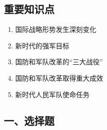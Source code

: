 \documentclass[a4paper,11pt]{ctexart}
\begin{document}
\subsection{重要知识点}
\begin{enumerate}
    \item 国际战略形势发生深刻变化
    \item 新时代的强军目标
    \item 国防和军队改革的“三大战役”
    \item 国防和军队改革取得重大成效
    \item 新时代人民军队使命任务
\end{enumerate}

\subsection{一、选择题}
\end{document}
